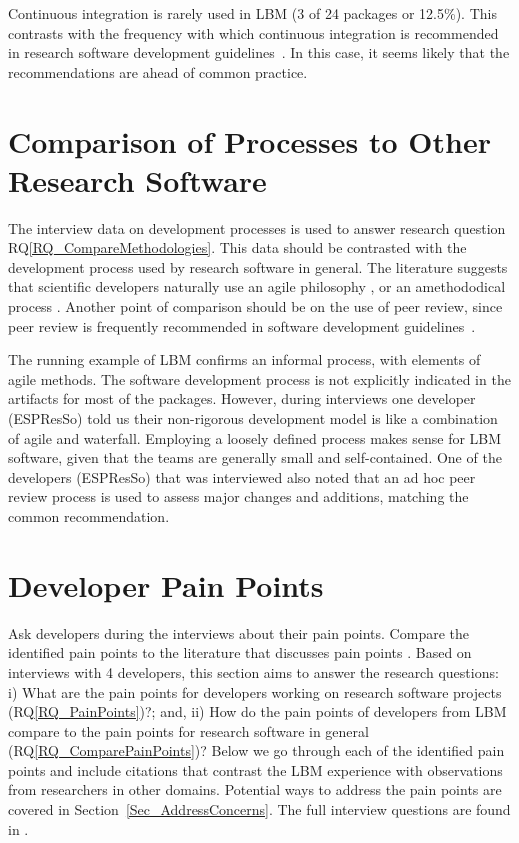 \documentclass[runningheads]{llncs}
\newcommand{\rqref}[1]{RQ\ref{#1}}
\begin{document}
Continuous integration is rarely used in LBM (3 of 24 packages or 12.5\%). This
contrasts with the frequency with which continuous integration is recommended in
research software development
guidelines~\cite{BrettEtAl2021,vanGompelEtAl2016,ThielEtAl2020}. In this case,
it seems likely that the recommendations are ahead of common practice.

\section{Comparison of Processes to Other Research Software} \label{Sec_CompareMethodologies}

The interview data on development processes is used to answer research question
\rqref{RQ_CompareMethodologies}.  This data should be contrasted with the
development process used by research software in general. The literature
suggests that scientific developers naturally use an agile philosophy
\cite{CarverEtAl2007,Segal2005}, or an amethododical process \cite{Kelly2013}.
Another point of comparison should be on the use of peer review, since peer
review is frequently recommended in software development
guidelines~\cite{HerouxEtAl2008,OrvizEtAl2017,USGS2019}.

The running example of LBM confirms an informal process, with elements of agile
methods. The software development process is not explicitly indicated in the
artifacts for most of the packages. However, during interviews one developer
(ESPResSo) told us their non-rigorous development model is like a combination of
agile and waterfall. Employing a loosely defined process makes sense for LBM
software, given that the teams are generally small and self-contained. One of
the developers (ESPResSo) that was interviewed also noted that an ad hoc peer
review process is used to assess major changes and additions, matching the
common recommendation.

\section{Developer Pain Points} \label{painpoints}

Ask developers during the interviews about their pain points.  Compare the identified pain points to the literature that discusses pain points \cite{Wieseet}.
Based on interviews with 4 developers, this section aims to answer the research
questions: i) What are the pain points for developers working on research
software projects (\rqref{RQ_PainPoints})?; and, ii) How do the pain points of
developers from LBM compare to the pain points for research software in general
(\rqref{RQ_ComparePainPoints})?  Below we go through each of the identified pain
points and include citations that contrast the LBM experience with observations
from researchers in other domains.  Potential ways to address the pain points
are covered in Section~\ref{Sec_AddressConcerns}. The full interview questions
are found in \cite{SmithEtAl2021}.
\end{document}
